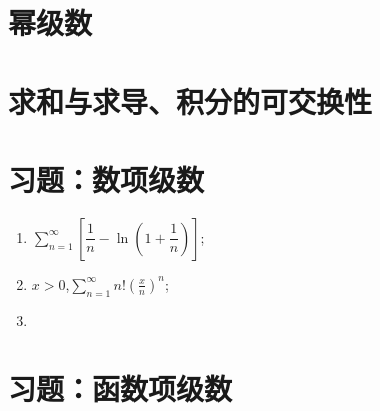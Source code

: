 \section{幂级数}
\section{求和与求导、积分的可交换性}
\section{习题：数项级数}
\begin{exercise}[判断下列正项级数的敛散性]
    \begin{enumerate}
        \item \(\displaystyle\sum\limits_{n=1}^{\infty}\left[\dfrac{1}{n}-\ln(1+\dfrac{1}{n})\right]\);
        \item \(x>0\),\enspace  \(\displaystyle\sum\limits_{n=1}^{\infty}n!(\frac{x}{n})^n\);
        \item 
    \end{enumerate}
\end{exercise}
\section{习题：函数项级数}